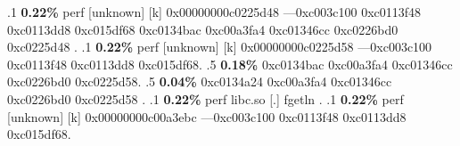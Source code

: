 \begin{profile}
{.1 \textbf{ 0.22\%} perf             [unknown]              [k] 0x00000000c0225d48\newline {} ---0xc003c100\newline {} 0xc0113f48\newline {} 0xc0113dd8\newline {} 0xc015df68\newline {} 0xc0134bac\newline {} 0xc00a3fa4\newline {} 0xc01346cc\newline {} 0xc0226bd0\newline {} 0xc0225d48\newline {} . 
.1 \textbf{ 0.22\%} perf             [unknown]              [k] 0x00000000c0225d58\newline {} ---0xc003c100\newline {} 0xc0113f48\newline {} 0xc0113dd8\newline {} 0xc015df68. 
.5 \textbf{0.18\%} 0xc0134bac\newline {} 0xc00a3fa4\newline {} 0xc01346cc\newline {} 0xc0226bd0\newline {} 0xc0225d58. 
.5 \textbf{0.04\%} 0xc0134a24\newline {} 0xc00a3fa4\newline {} 0xc01346cc\newline {} 0xc0226bd0\newline {} 0xc0225d58\newline {} . 
.1 \textbf{ 0.22\%} perf             libc.so                [.] fgetln\newline {} . 
.1 \textbf{ 0.22\%} perf             [unknown]              [k] 0x00000000c00a3ebc\newline {} ---0xc003c100\newline {} 0xc0113f48\newline {} 0xc0113dd8\newline {} 0xc015df68. 
}
\end{profile}
